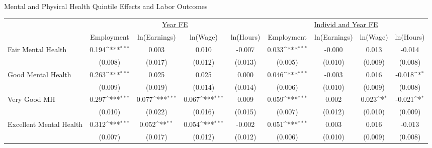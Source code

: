 \def\sym#1{\ifmmode^{#1}\else\(^{#1}\)\fi}
\caption{Mental and Physical Health Quintile Effects and Labor Outcomes}
\footnotesize\begin{tabular}{l*{8}{c}}
                    &\multicolumn{4}{c}{\underline{Year FE}}                                                &\multicolumn{4}{c}{\underline{Individ and Year FE}}                                    \\\cmidrule(lr){2-5}\cmidrule(lr){6-9}
                    &\multicolumn{1}{c}{Employment}&\multicolumn{1}{c}{ln(Earnings)}&\multicolumn{1}{c}{ln(Wage)}&\multicolumn{1}{c}{ln(Hours)}&\multicolumn{1}{c}{Employment}&\multicolumn{1}{c}{ln(Earnings)}&\multicolumn{1}{c}{ln(Wage)}&\multicolumn{1}{c}{ln(Hours)}\\
\hline
Fair Mental Health  &       0.194\sym{***}&       0.003         &       0.010         &      -0.007         &       0.033\sym{***}&      -0.000         &       0.013         &      -0.014         \\
                    &     (0.008)         &     (0.017)         &     (0.012)         &     (0.013)         &     (0.005)         &     (0.010)         &     (0.009)         &     (0.008)         \\
Good Mental Health  &       0.263\sym{***}&       0.025         &       0.025         &       0.000         &       0.046\sym{***}&      -0.003         &       0.016         &      -0.018\sym{*}  \\
                    &     (0.009)         &     (0.019)         &     (0.014)         &     (0.014)         &     (0.006)         &     (0.010)         &     (0.009)         &     (0.008)         \\
Very Good MH        &       0.297\sym{***}&       0.077\sym{***}&       0.067\sym{***}&       0.009         &       0.059\sym{***}&       0.002         &       0.023\sym{*}  &      -0.021\sym{*}  \\
                    &     (0.010)         &     (0.022)         &     (0.016)         &     (0.015)         &     (0.007)         &     (0.012)         &     (0.010)         &     (0.009)         \\
Excellent Mental Health&       0.312\sym{***}&       0.052\sym{**} &       0.054\sym{***}&      -0.002         &       0.051\sym{***}&       0.003         &       0.016         &      -0.013         \\
                    &     (0.007)         &     (0.017)         &     (0.012)         &     (0.012)         &     (0.006)         &     (0.010)         &     (0.009)         &     (0.008)         \\

\end{tabular}
